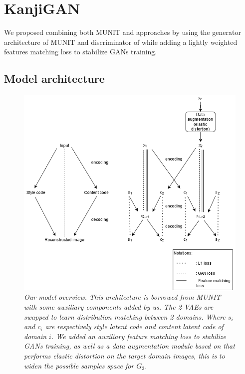 \documentclass[12pt]{report}
\begin{document}
\section{KanjiGAN}

We proposed combining both MUNIT and \cite{ganimorph} approaches by using the generator architecture of MUNIT and discriminator of \cite{ganimorph} while adding a lightly weighted features matching loss \cite{fm-loss} to stabilize GANs training.

\subsection{Model architecture}

\begin{figure}[H]
	\centering
	\includegraphics[scale=0.7]{model-overview}
	\caption{\textit{Our model overview. This architecture is borrowed from MUNIT\cite{munit} with some auxiliary components added by us. The 2 VAEs are swapped to learn distribution matching between 2 domains. Where $s_i$ and $c_i$ are respectively style latent code and content latent code of domain $i$. We added an auxiliary feature matching loss to stabilize GANs training, as well as a data augmentation module based on \cite{augmentor} that performs elastic distortion on the target domain images, this is to widen the possible samples space for $G_2$.}}
	\label{fig:model-overview}
\end{figure}
\end{document}
